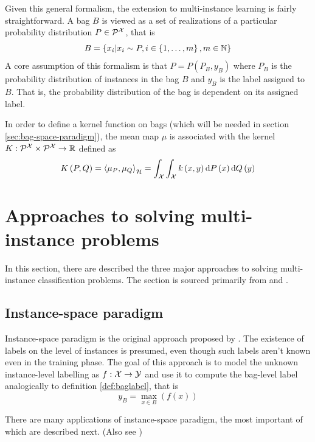 Given this general formalism, the extension to multi-instance learning is fairly straightforward. A bag \( B \) is viewed as a set of realizations of a particular probability distribution \( P \in \mathcal{P}^\mathspace{X} \), that is
\[ B = \left\{ x_i \middle| x_i \sim P, i \in \left\{ 1, \dots, m \right\}, m \in \mathbb{N} \right\} \]
A core assumption of this formalism is that \( P = P \left( P_B, y_B \right) \) where \( P_B \) is the probability distribution of instances in the bag \( B \) and \( y_B \) is the label assigned to \( B \). That is, the probability distribution of the bag is dependent on its assigned label.

In order to define a kernel function on bags (which will be needed in section \ref{sec:bag-space-paradigm}), the mean map \( \mu \) is associated with the kernel \( K : \mathcal{P}^\mathspace{X} \times \mathcal{P}^\mathspace{X} \to \mathfield{R} \) defined as
\[ K \left( P, Q \right) = \Braket{\mu_P, \mu_Q}_\mathspace{H} = \int_\mathspace{X} \int_\mathspace{X} k \left( x, y \right) \mathrm{d}P \left( x \right) \mathrm{d}Q \left( y \right) \]

\section{Approaches to solving multi-instance problems}
In this section, there are described the three major approaches to solving multi-instance classification problems. The section is sourced primarily from \cite{pevny_using_2017} and \cite{pevny_discriminative_2016}.

\subsection{Instance-space paradigm}
Instance-space paradigm is the original approach proposed by \cite{dietterich_solving_1997}. The existence of labels on the level of instances is presumed, even though such labels aren't known even in the training phase. The goal of this approach is to model the unknown instance-level labelling as \( f : \mathcal{X} \to \mathcal{Y} \) and use it to compute the bag-level label analogically to definition \ref{def:baglabel}, that is
\[ y_B = \max_{x \in B } \left( f \left( x \right) \right) \]

There are many applications of instance-space paradigm, the most important of which are described next. (Also see \cite{andrews_support_2002} \cite{zhang_multiple_2006})

